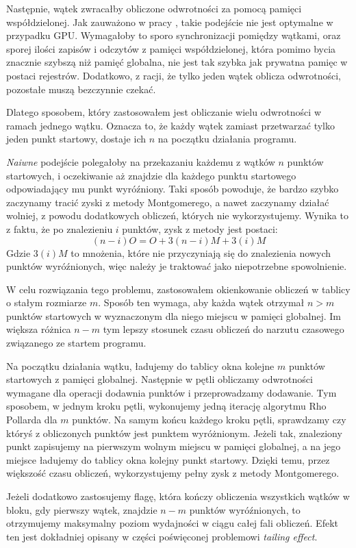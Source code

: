 Następnie, wątek zwracałby obliczone odwrotności za pomocą pamięci współdzielonej.
Jak zauważono w pracy \cite{Boss2015}, takie podejście nie jest optymalne w przypadku GPU.
Wymagałoby to sporo synchronizacji pomiędzy wątkami, oraz sporej ilości zapisów i odczytów
z pamięci współdzielonej, która pomimo bycia znacznie szybszą niż pamięć globalna, nie jest tak
szybka jak prywatna pamięc w postaci rejestrów. Dodatkowo, z racji, że tylko jeden
wątek oblicza odwrotności, pozostałe muszą bezczynnie czekać.
\par
Dlatego sposobem, który zastosowałem jest obliczanie wielu odwrotności
w ramach jednego wątku. Oznacza to, że każdy wątek zamiast przetwarzać tylko jeden punkt startowy,
dostaje ich $n$ na początku działania programu.
\par
\textit{Naiwne} podejście polegałoby na przekazaniu każdemu z wątków $n$ punktów startowych,
i oczekiwanie aż znajdzie dla każdego punktu startowego odpowiadający mu punkt wyróźniony. Taki sposób powoduje,
że bardzo szybko zaczynamy tracić zyski z metody Montgomerego, a nawet zaczynamy działać wolniej,
z powodu dodatkowych obliczeń, których nie wykorzystujemy.
Wynika to z faktu,
że po znalezieniu $i$ punktów, zysk z metody jest postaci:
$$
    (n-i)O = O + 3(n-i)M + 3(i)M
$$
Gdzie $3(i)M$ to mnożenia, które nie przyczyniają się do znalezienia nowych punktów wyróźnionych, więc należy je traktować jako niepotrzebne spowolnienie.
\par
W celu rozwiązania tego problemu, zastosowałem okienkowanie obliczeń w tablicy o stałym rozmiarze $m$.
Sposób ten wymaga, aby każda wątek otrzymał $n > m$ punktów startowych w wyznaczonym dla niego miejscu w pamięci globalnej.
Im większa różnica $n-m$ tym lepszy
stosunek czasu obliczeń do narzutu czasowego związanego ze startem programu.
\par
Na początku działania wątku, ładujemy do tablicy okna kolejne $m$ punktów startowych z pamięci globalnej.
Następnie w pętli obliczamy odwrotności wymagane dla operacji dodawnia punktów i przeprowadzamy dodawanie. Tym sposobem,
w jednym kroku pętli, wykonujemy jedną iterację algorytmu Rho Pollarda dla $m$ punktów. Na samym końcu każdego kroku pętli,
sprawdzamy czy któryś z obliczonych punktów jest punktem wyróżnionym. Jeżeli tak,
znaleziony punkt zapisujemy na pierwszym wolnym miejscu w pamięci globalnej, a na jego miejsce ładujemy do tablicy
okna kolejny punkt startowy.
Dzięki temu, przez większość czasu obliczeń, wykorzystujemy pełny zysk z metody Montgomerego.
\par
Jeżeli dodatkowo zastosujemy flagę, która kończy obliczenia wszystkich wątków w bloku, gdy pierwszy wątek,
znajdzie $n-m$ punktów wyróźnionych, to otrzymujemy maksymalny poziom wydajności w ciągu całej fali obliczeń.
Efekt ten jest dokładniej opisany w części poświęconej problemowi \textit{tailing effect}.

